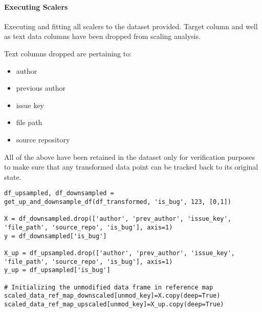 \paragraph{Executing Scalers}
Executing and fitting all scalers to the dataset provided. Target column and well as text data columns have been dropped from scaling analysis.

Text columns dropped are pertaining to:
\begin{itemize}
    \item author
    \item previous author
    \item issue key
    \item file path
    \item source repository
\end{itemize}

All of the above have been retained in the dataset only for verification purposes to make sure that any transformed data point can be tracked back to its original state.

\begin{code}
\label{code:scalers:setup-of-objects-and-drop-text-cols}
\begin{verbatim}
df_upsampled, df_downsampled = get_up_and_downsample_df(df_transformed, 'is_bug', 123, [0,1])

X = df_downsampled.drop(['author', 'prev_author', 'issue_key', 'file_path', 'source_repo', 'is_bug'], axis=1)
y = df_downsampled['is_bug']

X_up = df_upsampled.drop(['author', 'prev_author', 'issue_key', 'file_path', 'source_repo', 'is_bug'], axis=1)
y_up = df_upsampled['is_bug']

# Initializing the unmodified data frame in reference map
scaled_data_ref_map_downscaled[unmod_key]=X.copy(deep=True)
scaled_data_ref_map_upscaled[unmod_key]=X_up.copy(deep=True)
\end{verbatim}
\end{code}

